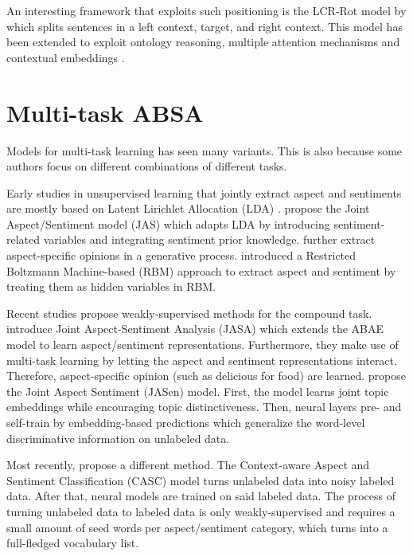 \documentclass[american, oneside]{ecsgdp}
\begin{document}
An interesting framework that exploits such positioning is the LCR-Rot model by \textcite{Zheng2018LCR-Rot} which splits sentences in a left context, target, and right context. This model has been extended to exploit ontology reasoning, multiple attention mechanisms and contextual embeddings \parencite{Schouten2017Ontology, Wallaart2019HAABSA, Trusca2020HAABSA++}.

\section{Multi-task ABSA} \label{sec:multi-task}

Models for multi-task learning has seen many variants. This is also because some authors focus on different combinations of different tasks. 

Early studies in unsupervised learning that jointly extract aspect and sentiments are mostly based on Latent Lirichlet Allocation (LDA) \parencite{Blei2003LDA}. \textcite{Xu2012JAS} propose the Joint Aspect/Sentiment model (JAS) which adapts LDA by introducing sentiment-related variables and integrating sentiment prior knowledge. \textcite{Zhao2010MaxEnt-LDA} further extract aspect-specific opinions in a generative process. \textcite{Wang2015Boltzmann} introduced a Restricted Boltzmann Machine-based (RBM) approach to extract aspect and sentiment by treating them as hidden variables in RBM.

Recent studies propose weakly-supervised methods for the compound task.
\textcite{Zhuang2020JASA} introduce Joint Aspect-Sentiment Analysis (JASA) which extends the ABAE model to learn aspect/sentiment representations. Furthermore, they make use of multi-task learning by letting the aspect and sentiment representations interact. Therefore, aspect-specific opinion (such as delicious for food) are learned. \textcite{Huang2020JASen} propose the Joint Aspect Sentiment (JASen) model. First, the model learns joint topic embeddings while encouraging topic distinctiveness. Then, neural layers pre- and self-train by embedding-based predictions which generalize the word-level discriminative information on unlabeled data. 

Most recently, \textcite{Kumar2021CASC} propose a different method. The Context-aware Aspect and Sentiment Classification (CASC) model turns unlabeled data into noisy labeled data. After that, neural models are trained on said labeled data. The process of turning unlabeled data to labeled data is only weakly-supervised and requires a small amount of seed words per aspect/sentiment category, which turns into a full-fledged vocabulary list. 
\end{document}
